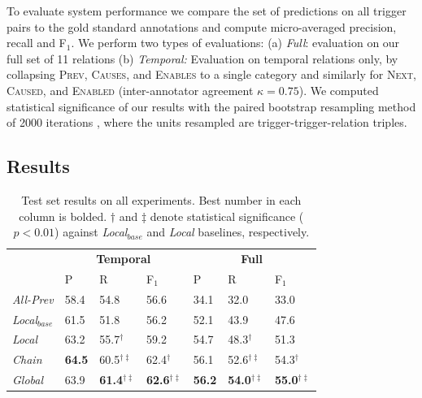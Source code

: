 
To evaluate system performance we compare the set of predictions on all trigger pairs to the gold standard annotations and compute micro-averaged precision, recall and F$_1$. We perform two types of evaluations: (a) \emph{Full}: evaluation on our full set of 11 relations (b) \emph{Temporal:} Evaluation on temporal relations only, by collapsing \textsc{Prev}, \textsc{Causes}, and \textsc{Enables} to a single category and similarly for \textsc{Next}, \textsc{Caused}, and \textsc{Enabled} (inter-annotator agreement $\kappa=0.75$). We computed statistical significance of our results with the paired bootstrap resampling method of 2000 iterations \cite{efron1993}, where the units resampled are trigger-trigger-relation triples.

\subsection{Results} \label{subsec:results}

\begin{table}[t]
\setlength{\tabcolsep}{5pt}
{\footnotesize
\begin{tabular}{  l | l  l  l | l  l  l  }
    & \multicolumn{3}{c|}{\textbf{Temporal}} & \multicolumn{3}{c}{\textbf{Full}} \\
    & P & R & F$_1$ & P & R & F$_1$ \\
\hline
\emph{All-Prev} & 58.4 & 54.8 & 56.6 & 34.1 & 32.0 & 33.0 \\
\emph{Local$_{base}$} & 61.5 & 51.8 & 56.2 &  52.1 & 43.9 & 47.6\\
\emph{Local} & 63.2 & 55.7$^{\dagger}$ & 59.2 & 54.7 & 48.3$^{\dagger}$ & 51.3 \\
\emph{Chain} & \textbf{64.5} & 60.5$^{\dagger\ddagger}$ & 62.4$^{\dagger}$ & 56.1 & 52.6$^{\dagger\ddagger}$ & 54.3$^{\dagger}$ \\ 
\emph{Global} & 63.9 & \textbf{61.4$^{\dagger\ddagger}$} & \textbf{62.6$^{\dagger\ddagger}$} & \textbf{56.2} & \textbf{54.0$^{\dagger\ddagger}$} & \textbf{55.0$^{\dagger\ddagger}$} 
\end{tabular}}
\caption{Test set results on all experiments. Best number in each column is bolded. $\dagger$ and $\ddagger$ denote statistical significance ($p<0.01$) against \emph{Local$_{base}$} and \emph{Local} baselines, respectively.}
\label{tab:results}
\end{table}

